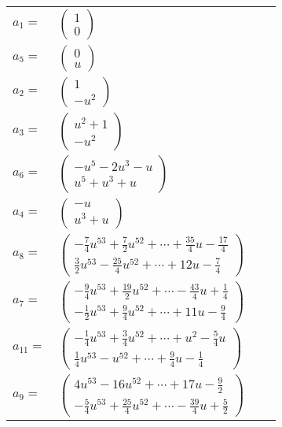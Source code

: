 \documentclass[1p]{elsarticle_modified}
\theoremstyle{definition}
\begin{document}
\begin{tabular}{m{7pt} m{180pt} m{7pt} m{180pt} }
\flushright $a_{1}=$&$\begin{pmatrix}1\\0\end{pmatrix}$ \\
\flushright $a_{5}=$&$\begin{pmatrix}0\\u\end{pmatrix}$ \\
\flushright $a_{2}=$&$\begin{pmatrix}1\\- u^2\end{pmatrix}$ \\
\flushright $a_{3}=$&$\begin{pmatrix}u^2+1\\- u^2\end{pmatrix}$ \\
\flushright $a_{6}=$&$\begin{pmatrix}- u^5-2 u^3- u\\u^5+u^3+u\end{pmatrix}$ \\
\flushright $a_{4}=$&$\begin{pmatrix}- u\\u^3+u\end{pmatrix}$ \\
\flushright $a_{8}=$&$\begin{pmatrix}-\frac{7}{4} u^{53}+\frac{7}{2} u^{52}+\cdots+\frac{35}{4} u-\frac{17}{4}\\\frac{3}{2} u^{53}-\frac{25}{4} u^{52}+\cdots+12 u-\frac{7}{4}\end{pmatrix}$ \\
\flushright $a_{7}=$&$\begin{pmatrix}-\frac{9}{4} u^{53}+\frac{19}{2} u^{52}+\cdots-\frac{43}{4} u+\frac{1}{4}\\-\frac{1}{2} u^{53}+\frac{9}{4} u^{52}+\cdots+11 u-\frac{9}{4}\end{pmatrix}$ \\
\flushright $a_{11}=$&$\begin{pmatrix}-\frac{1}{4} u^{53}+\frac{3}{4} u^{52}+\cdots+u^2-\frac{5}{4} u\\\frac{1}{4} u^{53}- u^{52}+\cdots+\frac{9}{4} u-\frac{1}{4}\end{pmatrix}$ \\
\flushright $a_{9}=$&$\begin{pmatrix}4 u^{53}-16 u^{52}+\cdots+17 u-\frac{9}{2}\\-\frac{5}{4} u^{53}+\frac{25}{4} u^{52}+\cdots-\frac{39}{4} u+\frac{5}{2}\end{pmatrix}$ \\

\end{tabular}
\end{document}
